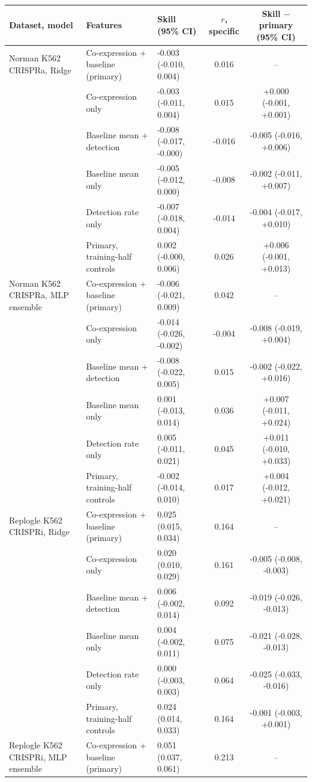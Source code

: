 \begin{tabular}{lllcc}
\toprule
Dataset, model & Features & Skill (95\% CI) & $r$, specific & Skill $-$ primary (95\% CI) \\
\midrule
Norman K562 CRISPRa, Ridge & Co-expression + baseline (primary) & -0.003 (-0.010, 0.004) & 0.016 & -- \\
 & Co-expression only & -0.003 (-0.011, 0.004) & 0.015 & +0.000 (-0.001, +0.001) \\
 & Baseline mean + detection & -0.008 (-0.017, -0.000) & -0.016 & -0.005 (-0.016, +0.006) \\
 & Baseline mean only & -0.005 (-0.012, 0.000) & -0.008 & -0.002 (-0.011, +0.007) \\
 & Detection rate only & -0.007 (-0.018, 0.004) & -0.014 & -0.004 (-0.017, +0.010) \\
 & Primary, training-half controls & 0.002 (-0.000, 0.006) & 0.026 & +0.006 (-0.001, +0.013) \\
Norman K562 CRISPRa, MLP ensemble & Co-expression + baseline (primary) & -0.006 (-0.021, 0.009) & 0.042 & -- \\
 & Co-expression only & -0.014 (-0.026, -0.002) & -0.004 & -0.008 (-0.019, +0.004) \\
 & Baseline mean + detection & -0.008 (-0.022, 0.005) & 0.015 & -0.002 (-0.022, +0.016) \\
 & Baseline mean only & 0.001 (-0.013, 0.014) & 0.036 & +0.007 (-0.011, +0.024) \\
 & Detection rate only & 0.005 (-0.011, 0.021) & 0.045 & +0.011 (-0.010, +0.033) \\
 & Primary, training-half controls & -0.002 (-0.014, 0.010) & 0.017 & +0.004 (-0.012, +0.021) \\
Replogle K562 CRISPRi, Ridge & Co-expression + baseline (primary) & 0.025 (0.015, 0.034) & 0.164 & -- \\
 & Co-expression only & 0.020 (0.010, 0.029) & 0.161 & -0.005 (-0.008, -0.003) \\
 & Baseline mean + detection & 0.006 (-0.002, 0.014) & 0.092 & -0.019 (-0.026, -0.013) \\
 & Baseline mean only & 0.004 (-0.002, 0.011) & 0.075 & -0.021 (-0.028, -0.013) \\
 & Detection rate only & 0.000 (-0.003, 0.003) & 0.064 & -0.025 (-0.033, -0.016) \\
 & Primary, training-half controls & 0.024 (0.014, 0.033) & 0.164 & -0.001 (-0.003, +0.001) \\
Replogle K562 CRISPRi, MLP ensemble & Co-expression + baseline (primary) & 0.051 (0.037, 0.061) & 0.213 & -- \\

\end{tabular}
